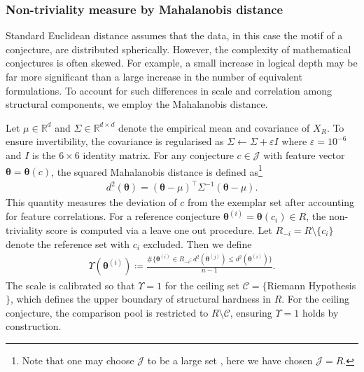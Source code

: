 \documentclass[11pt,reqno]{amsart}
\theoremstyle{plain}\newtheorem{theorem}{Theorem}[section]
\numberwithin{equation}{section}
\begin{document}
\subsubsection{Non-triviality measure by Mahalanobis distance}\label{mahalanobis}

Standard Euclidean distance assumes that the data, in this case the motif of a conjecture, are distributed spherically. However, the complexity of mathematical conjectures is often skewed. For example, a small increase in logical depth may be far more significant than a large increase in the number of equivalent formulations. To account for such differences in scale and correlation among structural components, we employ the Mahalanobis distance.

\medskip
\noindent
Let $\mu\in\mathbb{R}^d$ and $\Sigma\in\mathbb{R}^{d\times d}$ denote the empirical mean and covariance of $X_R$. To ensure invertibility, the covariance is regularised as $\Sigma \leftarrow \Sigma + \varepsilon I$ where $\varepsilon = 10^{-6}$ and $I$ is the $6\times 6$ identity matrix. For any conjecture $c\in\mathcal{J}$ with feature vector ${\bm{\theta}}={\bm{\theta}}(c)$, the squared Mahalanobis distance is defined as\footnote{Note that one may choose $\mathcal{J}$ to be a large set , here we have chosen $\mathcal{J}=R$.}
\begin{align}\label{d2formula}
d^2({\bm{\theta}}) 
=({\bm{\theta}}-\mu)^{\top}\Sigma^{-1}({\bm{\theta}}-\mu).
\end{align}
This quantity measures the deviation of $c$ from the exemplar set after accounting for feature correlations. For a reference conjecture ${\bm{\theta}}^{(i)}={\bm{\theta}}(c_i) \in R$, the non-triviality score is computed via a leave one out procedure. Let $R_{-i} = R \setminus \{c_i\}$ denote the reference set with $c_i$ excluded. Then we define
\begin{align}\label{upsilon}
\Upsilon({\bm{\theta}}^{(i)}) 
\coloneqq \frac{\#\{{\bm{\theta}}^{(i)} \in R_{-i} : d^2({\bm{\theta}}^{(j)}) \leq d^2({\bm{\theta}}^{(i)})\}}{n-1}.
\end{align}
The scale is calibrated so that $\Upsilon = 1$ for the ceiling set $\mathcal{C} = \{$Riemann Hypothesis$\}$, which defines the upper boundary of structural hardness in $R$. For the ceiling conjecture, the comparison pool is restricted to $R \setminus \mathcal{C}$, ensuring $\Upsilon = 1$ holds by construction.
\end{document}

